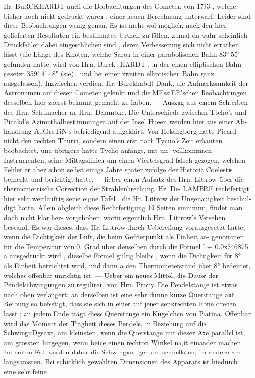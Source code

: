 \documentclass[12pt,a4paper]{article}
\begin{document}
{{{{{{{{Ilr.  BuRCKHARDT  aucli  die  Beobaclitungen  des  Cometen  von  1793 ,  welche  bisher  noch  nicht  gedruckt waren ,  einer  neuen  Berechnung  unterwarf.  Leider  sind  diese  Beobachtungen  wenig  genau.  Es  ist  nicht wol  möglich,  nach  den  hier  gelieferten  Resultaten  ein  bestimmtes  Urtheil  zu  fällen,  zumal  da  wahr scheinlich  Druckfehler  dabei  eingeschlichen  sind ,  deren  Verbesserung  sich  nicht  errathen  lässt  (die  Länge des  Knoten,  welche  Saron  in  einer  parabolischen  Bahn  83°  55'  gefunden  hatte,  wird  von  Hrn.  Burck- HARDT ,  in  der  einen  elliptischen  Bahn  gesetzt  359'  4'  48"  (sie) ,  und  bei  einer  zweiten  elliptischen  Bahn ganz  ausgelassen).  Inzwischen  verdient  Hr.  Burckhabdt  Dank,  die  Aufmerksamkeit  der  Astronomen  auf diesen  Cometen  gelenkt  und  die  MEssiER'schen  Beobachtungen  desselben  hier  zuerst  bekannt  gemacht zu  haben.  ---  Auszug  aus  einem  Schreiben  des  Hrn.  Schumacher  an  Hrn.  Delambke.  Die  Unterschiede zwischen  Ttcho's  und  Picakd's  Azimuthalbestimmungen  auf  der  Insel  Hueen  werden  hier  aus  einer  Ab- handlung AuGusTiN's  befriedigend  aufgeklärt.  Von  Helsingborg  hatte  Picard  nicht  den  rechten  Thurm, sondern  einen  erst  nach  Tycuo's  Zeit  erbauten  beobachtet,  und  übrigens  hatte  Tycho  anfangs,  mit  un- vollkommnen  Instrumenten,  seine  Mittagslinien  um  einen  Viertelsgrad  falsch  gezogen,  welchen  Fehler er  aber  schon  selbst  einige  Jahre  später  zufolge  der  Historia  Coelestis  bemerkt  und  berichtigt  hatte.  --- lieber  einen  Aufsatz  des  Hrn.  Littrow  über  die  thermometrische  Correction  der  Strahlenbrechung.  Hr.  De- LAMBRE  rechtfertigt  hier  sehr  weitläuftig  seine  eigne  Tafel ,  die  Hr.  Littrow  der  Ungenauigkeit  beschul- digt hatte.  Allein  obgleich  diese  Rechtfertigung  10  Seiten  einnimmt,  findet  man  doch  nicht  klar  her- vorgehoben, worin  eigentlich  Hrn.  Littrow's  Versehen  bestand.  Es  war  dieses,  dass  Hr.  Littrow  durch Uebereilung  vorausgesetzt  hatte,  wenn  die  Dichtigkeit  der  Luft,  die  beim  Gefrierpunkt  als  Einheit  an- genommen für  die  Temperatur  von  0.  Grad  über  denselben  durch  die  Formel I  +  0.0x346875  a ausgedrückt  wird ,  dieselbe  Formel  gültig  bleibe ,  wenn  die  Dichtigkeit  für  8°  als  Einheit  betrachtet  wird, und  dann  a  den  Thermometerstand  über  8°  bedeutet,  welches  offenbar  unrichtig  ist.  ---  Ueber  ein  neues Mittel,  die  Dauer  der  Pendelschwingungen  zu  reguliren,  von  Hrn.  Prony.  Die  Pendelstange  ist  etwas nach  oben  verlängert;  an  derselben  ist  eine  sehr  dünne  kurze  Querstange  auf  Reibung  so  befestigt,  dass sie  sich  in  einer  auf  jener  senkrechten  Ebne  drehen  lässt ;  an  jedem  Ende  trägt  diese  Querstange  ein Kügelchen  von  Piatina.  Offenbar  wird  das  Moment  der  Trägheit  dieses  Pendels,  in  Beziehung  auf  die SchwinguDgsaxe,  am  kleinsten,  wenn  die  Querstange  mit  dieser  Axe  parallel  ist,  am  grössten  hingegen, wenn  beide  einen  rechton  Winkel  na,it  einander  machen.  Im  ersten  Fall  werden  daher  die  Schwingun- gen am  schnellsten,  im  andern  am  langsamsten.  Bei  schicklich  gewählten  Dimensionen  des  Apparats ist  hiedurch  eine  sehr  feine  }}}}}}}}
\end{document}
